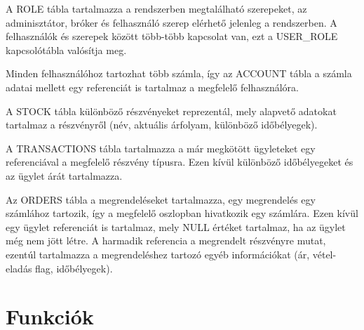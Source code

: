 A ROLE tábla tartalmazza a rendszerben megtalálható szerepeket, az adminisztátor, bróker és felhasználó szerep elérhető jelenleg a rendszerben. A felhasználók és szerepek között több-több kapcsolat van, ezt a USER_ROLE kapcsolótábla valósítja meg. 

Minden felhasználóhoz tartozhat több számla, így az ACCOUNT tábla a számla adatai mellett egy referenciát is tartalmaz a megfelelő felhasználóra.

A STOCK tábla különböző részvényeket reprezentál, mely alapvető adatokat tartalmaz a részvényről (név, aktuális árfolyam, különböző időbélyegek).

A TRANSACTIONS tábla tartalmazza a már megkötött ügyleteket egy referenciával a megfelelő részvény típusra. Ezen kívül különböző időbélyegeket és az ügylet árát tartalmazza.

Az ORDERS tábla a megrendeléseket tartalmazza, egy megrendelés egy számlához tartozik, így a megfelelő oszlopban hivatkozik egy számlára. Ezen kívül egy ügylet referenciát is tartalmaz, mely NULL értéket tartalmaz, ha az ügylet még nem jött létre. A harmadik referencia a megrendelt részvényre mutat, ezentúl tartalmazza a megrendeléshez tartozó egyéb információkat (ár, vétel-eladás flag, időbélyegek).

\section{Funkciók}\label{sect:rsz_funkciok}
